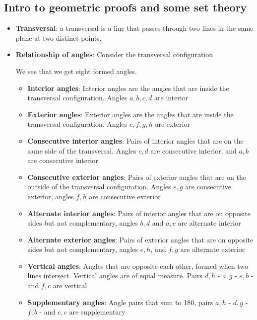 \documentclass{report}
\begin{document}
    \subsection{Intro to geometric proofs and some set theory}
    \begin{itemize}
        \item \textbf{Transversal}: a transversal is a line that passes through two lines in the same plane at two distinct points.
        \item \textbf{Relationship of angles}: Consider the transversal configuration
            \bigbreak \noindent 
            \begin{figure}[ht]
                \centering
                \label{fig:tc}
            \end{figure}
            \bigbreak \noindent 
            We see that we get eight formed angles.
            \begin{itemize}
                \item \textbf{Interior angles}: Interior angles are the angles that are inside the transversal configuration. Angles $a,b,c,d$ are interior
                \item \textbf{Exterior angles}: Exterior angles are the angles that are inside the transversal configuration. Angles $e,f,g,h$ are exterior
                \item \textbf{Consecutive interior angles}: Pairs of interior angles that are on the same side of the transversal. Angles $c,d$ are consecutive interior, and $a,b$ are consecutive interior
                \item \textbf{Consecutive exterior angles}: Pairs of exterior angles that are on the outside of the transversal configuration. Angles $e,g$ are consecutive exterior, angles $f,h$ are consecutive exterior
                \item \textbf{Alternate interior angles}: Pairs of interior angles that are on opposite sides but not complementary, angles $b,d$ and $a,c$ are alternate interior
                \item \textbf{Alternate exterior angles}: Pairs of exterior angles that are on opposite sides but not complementary, angles $e,h$, and $f,g$ are alternate exterior
                \item \textbf{Vertical angles}: Angles that are opposite each other, formed when two lines intersect. Vertical angles are of equal measure. Pairs $d,h$ - $a,g$ - $e,b$ - and $f,c$ are vertical
                \item \textbf{Supplementary angles}: Angle pairs that sum to 180, pairs $a,h$ - $d,g$ - $f,b$ - and $e,c$ are supplementary

\end{itemize}
\end{itemize}
\end{document}
